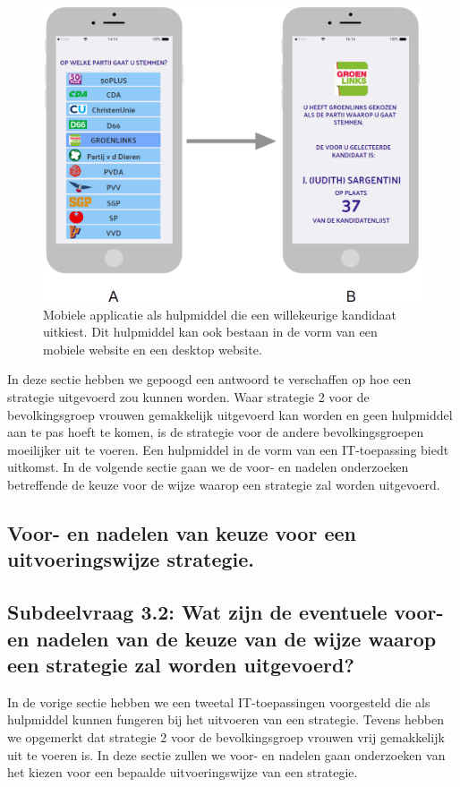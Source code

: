 \begin{figure}[H]


	\includegraphics[width=\linewidth]{app_verkiezingen.png}

			\caption{Mobiele applicatie als hulpmiddel die een willekeurige kandidaat uitkiest. Dit hulpmiddel kan ook bestaan in de vorm van een mobiele website en een desktop website.}

\label{fig:verkA}
\end{figure}

In deze sectie hebben we gepoogd een antwoord te verschaffen op hoe een strategie uitgevoerd zou kunnen worden. Waar strategie 2 voor de bevolkingsgroep vrouwen gemakkelijk uitgevoerd kan worden en geen hulpmiddel aan te pas hoeft te komen, is de strategie voor de andere bevolkingsgroepen moeilijker uit te voeren. Een hulpmiddel in de vorm van een IT-toepassing biedt uitkomst. In de volgende sectie gaan we de voor- en nadelen onderzoeken betreffende de keuze voor de wijze waarop een strategie zal worden uitgevoerd. 

\subsection{Voor- en nadelen van keuze voor een uitvoeringswijze strategie.}

\subsection*{Subdeelvraag 3.2: Wat zijn de eventuele voor- en nadelen van de keuze van de wijze waarop een strategie zal worden uitgevoerd?}
In de vorige sectie hebben we een tweetal IT-toepassingen voorgesteld die als hulpmiddel kunnen fungeren bij het uitvoeren van een strategie. Tevens hebben we opgemerkt dat strategie 2 voor de bevolkingsgroep vrouwen vrij gemakkelijk uit te voeren is. In deze sectie zullen we voor- en nadelen gaan onderzoeken van het kiezen voor een bepaalde uitvoeringswijze van een strategie. 

